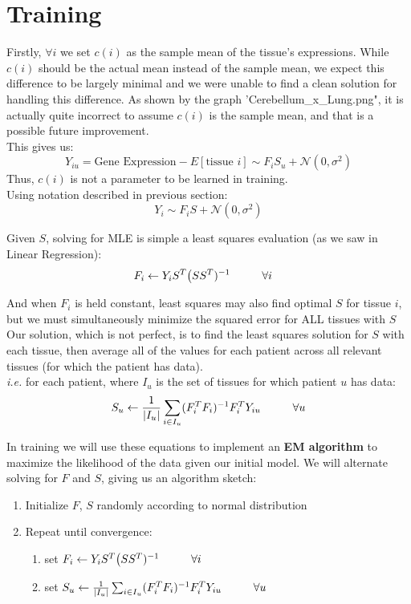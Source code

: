 \documentclass{article}
\newcommand{\hs}[1]{\hspace*{#1 cm}}
\newcommand{\tx}[1]{\text{#1}}
\begin{document}
\section{Training} %

Firstly, $\forall i$ we set $c(i)$ as the sample mean of the tissue's expressions. While $c(i)$ should be the actual mean instead of the sample mean, we expect this difference to be largely minimal and we were unable to find a clean solution for handling this difference. As shown by the graph 'Cerebellum\_x\_Lung.png", it is actually quite incorrect to assume $c(i)$ is the sample mean, and that is a possible future improvement. \\
This gives us:
\[ Y_{iu} = \tx{Gene Expression} - E[\tx{tissue } i] \sim F_i S_u + \mathcal{N}(0,\sigma^2) \]
Thus, $c(i)$ is not a parameter to be learned in training. \\
Using notation described in previous section:
\[ Y_i \sim F_i S + \mathcal{N}(0,\sigma^2) \]

Given $S$, solving for MLE is simple a least squares evaluation (as we saw in Linear Regression):
\begin{align*}
F_i &\leftarrow Y_i S^T\big(SS^T)^{-1} \hs{1}\forall i
\end{align*}

And when $F_i$ is held constant, least squares may also find optimal $S$ for tissue $i$, but we must simultaneously minimize the squared error for ALL tissues with $S$ \\

Our solution, which is not perfect, is to find the least squares solution for $S$ with each tissue, then average all of the values for each patient across all relevant tissues (for which the patient has data). \\
{\it i.e.} for each patient, where $I_u$ is the set of tissues for which patient $u$ has data:
\[ S_u \leftarrow \frac{1}{|I_u|}\sum_{i \in I_u} (F_i^TF_i)^{-1}F_i^T Y_{iu} \hs{1}\forall u\]

In training we will use these equations to implement an {\bf EM algorithm} to maximize the likelihood of the data given our initial model. We will alternate solving for $F$ and $S$, giving us an algorithm sketch:
\begin{enumerate}
\item Initialize $F$, $S$ randomly according to normal distribution
\item Repeat until convergence:
	\begin{enumerate}
	\item set $F_i \leftarrow Y_i S^T\big(SS^T)^{-1} \hs{1}\forall i$
	\item set $S_u \leftarrow \frac{1}{|I_u|}\sum_{i \in I_u} (F_i^TF_i)^{-1}F_i^T Y_{iu} \hs{1}\forall u$
	\end{enumerate}
\end{enumerate}
\end{document}
